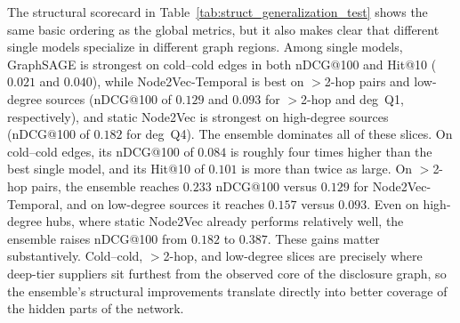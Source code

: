 The structural scorecard in Table~\ref{tab:struct_generalization_test} shows the same basic ordering as the global metrics, but it also makes clear that different single models specialize in different graph regions. Among single models, GraphSAGE is strongest on cold--cold edges in both nDCG@100 and Hit@10 (\(0.021\) and \(0.040\)), while Node2Vec-Temporal is best on \(>\)2-hop pairs and low-degree sources (nDCG@100 of \(0.129\) and \(0.093\) for \(>\)2-hop and deg~Q1, respectively), and static Node2Vec is strongest on high-degree sources (nDCG@100 of \(0.182\) for deg~Q4). The ensemble dominates all of these slices. On cold--cold edges, its nDCG@100 of \(0.084\) is roughly four times higher than the best single model, and its Hit@10 of \(0.101\) is more than twice as large. On \(>\)2-hop pairs, the ensemble reaches \(0.233\) nDCG@100 versus \(0.129\) for Node2Vec-Temporal, and on low-degree sources it reaches \(0.157\) versus \(0.093\). Even on high-degree hubs, where static Node2Vec already performs relatively well, the ensemble raises nDCG@100 from \(0.182\) to \(0.387\). These gains matter substantively. Cold--cold, \(>\)2-hop, and low-degree slices are precisely where deep-tier suppliers sit furthest from the observed core of the disclosure graph, so the ensemble's structural improvements translate directly into better coverage of the hidden parts of the network.

\begin{table}[tbp]
  \centering
  \caption[\textit{Structural \& Generalization Scorecard}]{\textit{Structural \& Generalization Scorecard}}
  \label{tab:struct_generalization_test}

  \resizebox{\linewidth}{!}{}

  \captionsetup{justification=raggedright,singlelinecheck=false}
  \caption*{\footnotesize \textit{Note}. Metrics are macro-averaged across eligible sources for each slice in the held-out \textit{test} window (2022-02-09 to 2025-06-09). {CC} = both endpoints cold (no observed edges in the train snapshot). {$>$2-hop} = endpoints have no path of length~$\leq 2$ in the train graph.
  {deg Q1/Q4} = lowest/highest quartiles by \emph{source out-degree} on the train snapshot.
  Candidate pools use \emph{undirected two-hop} reachability with \emph{uniform} fallback to a per-source budget of 5{,}000 candidate-pool (seed = 42), excluding earlier positives (\textit{val}: exclude train; \textit{test}: exclude train $\cup$ val).
  Labels are positive--unlabeled, so precision-like metrics are lower bounds.
  Boldface best-in-class excludes the Ensemble; the Ensemble row is shown for context.}
\end{table}

